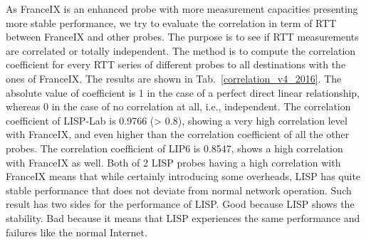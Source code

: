As FranceIX is an enhanced probe with more measurement capacities presenting more stable performance, we try to evaluate the correlation in term of RTT between FranceIX and other probes. The purpose is to see if RTT measurements are correlated or totally independent. The method is to compute the correlation coefficient for every RTT series of different probes to all destinations with the ones of FranceIX. The results are shown in Tab.~\ref{correlation_v4_2016}. The absolute value of coefficient is 1 in the case of a perfect direct linear relationship, whereas 0 in the case of no correlation at all, i.e., independent. The correlation coefficient of LISP-Lab is 0.9766 (> 0.8), showing a very high correlation level with FranceIX, and even higher than the correlation coefficient of all the other probes. The correlation coefficient of LIP6 is 0.8547, shows a high correlation with FranceIX as well. Both of 2 LISP probes having a high correlation with FranceIX means that while certainly introducing some overheads, LISP has quite stable performance that does not deviate from normal network operation. Such result has two sides for the performance of LISP. Good because LISP shows the stability. Bad because it means that LISP experiences the same performance and failures like the normal Internet.

